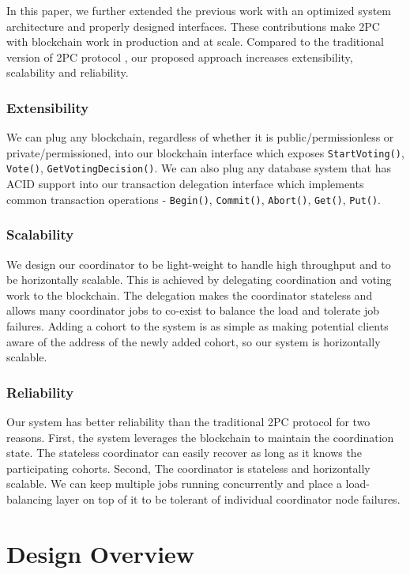 \documentclass[11pt,conference]{IEEEtran}
\begin{document}
In this paper, we further extended the previous work with an optimized system architecture and properly designed interfaces. These contributions make 2PC with blockchain work in production and at scale. Compared to the traditional version of 2PC protocol \cite{}, our proposed approach increases extensibility, scalability and reliability.

\subsubsection{Extensibility}
We can plug any blockchain, regardless of whether it is public/permissionless or private/permissioned, into our blockchain interface which exposes \texttt{StartVoting()}, \texttt{Vote()}, \texttt{GetVotingDecision()}. We can also plug any database system that has ACID support into our transaction delegation interface which implements common transaction operations - \texttt{Begin()}, \texttt{Commit()}, \texttt{Abort()}, \texttt{Get()}, \texttt{Put()}.

\subsubsection{Scalability}
We design our coordinator to be light-weight to handle high throughput and to be horizontally scalable. This is achieved by delegating coordination and voting work to the blockchain. The delegation makes the coordinator stateless and allows many coordinator jobs to co-exist to balance the load and tolerate job failures. Adding a cohort to the system is as simple as making potential clients aware of the address of the newly added cohort, so our system is horizontally scalable.

\subsubsection{Reliability}
Our system has better reliability than the traditional 2PC protocol for two reasons. First, the system leverages the blockchain to maintain the coordination state. The stateless coordinator can easily recover as long as it knows the participating cohorts. Second, The coordinator is stateless and horizontally scalable. We can keep multiple jobs running concurrently and place a load-balancing layer on top of it to be tolerant of individual coordinator node failures.

\section{Design Overview}
\end{document}
